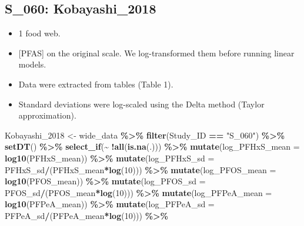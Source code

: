 \documentclass[
]{article}
\newenvironment{Shaded}{\begin{snugshade}}{\end{snugshade}}
\newcommand{\AttributeTok}[1]{\textcolor[rgb]{0.13,0.29,0.53}{#1}}
\newcommand{\DecValTok}[1]{\textcolor[rgb]{0.00,0.00,0.81}{#1}}
\newcommand{\FunctionTok}[1]{\textcolor[rgb]{0.13,0.29,0.53}{\textbf{#1}}}
\newcommand{\NormalTok}[1]{#1}
\newcommand{\OtherTok}[1]{\textcolor[rgb]{0.56,0.35,0.01}{#1}}
\newcommand{\SpecialCharTok}[1]{\textcolor[rgb]{0.81,0.36,0.00}{\textbf{#1}}}
\newcommand{\StringTok}[1]{\textcolor[rgb]{0.31,0.60,0.02}{#1}}
\providecommand{\tightlist}{%
  \setlength{\itemsep}{0pt}\setlength{\parskip}{0pt}}
\begin{document}
\subsection{S\_060: Kobayashi\_2018}\label{s_060-kobayashi_2018}

\begin{itemize}
\tightlist
\item
  1 food web.
\item
  {[}PFAS{]} on the original scale. We log-transformed them before
  running linear models.
\item
  Data were extracted from tables (Table 1).
\item
  Standard deviations were log-scaled using the Delta method (Taylor
  approximation).
\end{itemize}

\begin{Shaded}
\begin{Highlighting}[]
\NormalTok{Kobayashi\_2018 }\OtherTok{\textless{}{-}}\NormalTok{ wide\_data }\SpecialCharTok{\%\textgreater{}\%} 
  \FunctionTok{filter}\NormalTok{(Study\_ID }\SpecialCharTok{==} \StringTok{"S\_060"}\NormalTok{) }\SpecialCharTok{\%\textgreater{}\%} 
  \FunctionTok{setDT}\NormalTok{() }\SpecialCharTok{\%\textgreater{}\%}
  \FunctionTok{select\_if}\NormalTok{(}\SpecialCharTok{\textasciitilde{}} \SpecialCharTok{!}\FunctionTok{all}\NormalTok{(}\FunctionTok{is.na}\NormalTok{(.))) }\SpecialCharTok{\%\textgreater{}\%}
  \FunctionTok{mutate}\NormalTok{(}\AttributeTok{log\_PFHxS\_mean =} \FunctionTok{log10}\NormalTok{(PFHxS\_mean)) }\SpecialCharTok{\%\textgreater{}\%} 
  \FunctionTok{mutate}\NormalTok{(}\AttributeTok{log\_PFHxS\_sd =}\NormalTok{ PFHxS\_sd}\SpecialCharTok{/}\NormalTok{(PFHxS\_mean}\SpecialCharTok{*}\FunctionTok{log}\NormalTok{(}\DecValTok{10}\NormalTok{))) }\SpecialCharTok{\%\textgreater{}\%}
  \FunctionTok{mutate}\NormalTok{(}\AttributeTok{log\_PFOS\_mean =} \FunctionTok{log10}\NormalTok{(PFOS\_mean)) }\SpecialCharTok{\%\textgreater{}\%} 
  \FunctionTok{mutate}\NormalTok{(}\AttributeTok{log\_PFOS\_sd =}\NormalTok{ PFOS\_sd}\SpecialCharTok{/}\NormalTok{(PFOS\_mean}\SpecialCharTok{*}\FunctionTok{log}\NormalTok{(}\DecValTok{10}\NormalTok{))) }\SpecialCharTok{\%\textgreater{}\%}
  \FunctionTok{mutate}\NormalTok{(}\AttributeTok{log\_PFPeA\_mean =} \FunctionTok{log10}\NormalTok{(PFPeA\_mean)) }\SpecialCharTok{\%\textgreater{}\%} 
  \FunctionTok{mutate}\NormalTok{(}\AttributeTok{log\_PFPeA\_sd =}\NormalTok{ PFPeA\_sd}\SpecialCharTok{/}\NormalTok{(PFPeA\_mean}\SpecialCharTok{*}\FunctionTok{log}\NormalTok{(}\DecValTok{10}\NormalTok{))) }\SpecialCharTok{\%\textgreater{}\%}

\end{Highlighting}
\end{Shaded}
\end{document}

